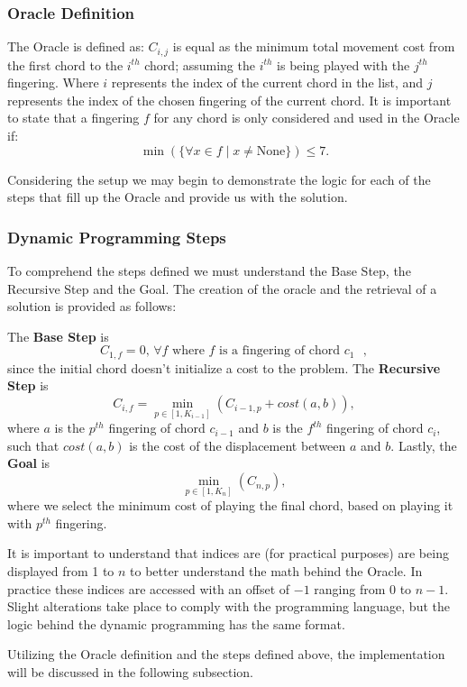 \documentclass[conference]{IEEEtran}
\begin{document}
\subsubsection{Oracle Definition}
The Oracle is defined as: \(C_{i,j}\) is equal as the minimum total movement cost from the first chord to the \(i^{th}\) chord; assuming the \(i^{th}\) is being played with the \(j^{th}\) fingering. Where \(i\) represents the index of the current chord in the list, and \(j\) represents the index of the chosen fingering of the current chord. 
It is important to state that a fingering \(f\) for any chord is only considered and used in the Oracle if:
\[ \min(\{\forall x \in f \mid x \neq \text{None}\}) \leq 7. \]

Considering the setup we may begin to demonstrate the logic for each of the steps that fill up the Oracle and provide us with the solution. 

\subsubsection{Dynamic Programming Steps}
To comprehend the steps defined we must understand the Base Step, the Recursive Step and the Goal. The creation of the oracle and the retrieval of a solution is provided as follows:

The \textbf{Base Step} is \[ C_{1,f} = 0 \text{, \(\forall f\) where \(f\) is a fingering of chord \(c_1\) }, \] since the initial chord doesn't initialize a cost to the problem. The \textbf{Recursive Step} is \[ C_{i,f} = \min_{p \in [1, K_{i-1}]}(C_{i-1, p} + cost(a, b)), \] where \(a\) is the \(p^{th}\) fingering of chord \(c_{i-1}\) and \(b\) is the \(f^{th}\) fingering of chord \(c_i\), such that \(cost(a,b)\) is the cost of the displacement between \(a\) and \(b\). Lastly, the \textbf{Goal} is \[ \min_{p \in [1, K_{n}]}(C_{n, p}), \] where we select the minimum cost of playing the final chord, based on playing it with \(p^{th}\) fingering.

It is important to understand that indices are (for practical purposes) are being displayed from 1 to $n$ to better understand the math behind the Oracle. In practice these indices are accessed with an offset of $-1$ ranging from 0 to $n-1$. Slight alterations take place to comply with the programming language, but the logic behind the dynamic programming has the same format.

Utilizing the Oracle definition and the steps defined above, the implementation will be discussed in the following subsection.
\end{document}
